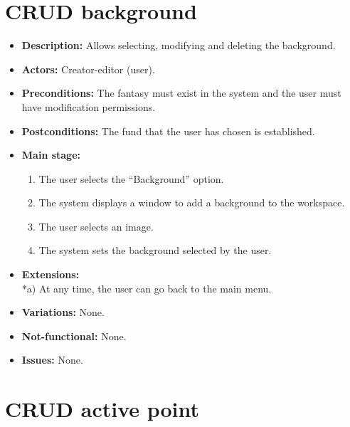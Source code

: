 \section{CRUD background}
\begin{itemize}
	\item \textbf{Description:} Allows selecting, modifying and deleting the background.
	\item \textbf{Actors:} Creator-editor (user).
	\item \textbf{Preconditions:} The fantasy must exist in the system and the user must have modification permissions.
	\item \textbf{Postconditions:} The fund that the user has chosen is established.
	\item \textbf{Main stage:}
	\begin{enumerate}
		\item The user selects the ``Background'' option.
		\item The system displays a window to add a background to the workspace.
		\item The user selects an image.
		\item The system sets the background selected by the user.
	\end{enumerate}
	\item \textbf{Extensions:} \\ *a) At any time, the user can go back to the main menu. 
	\item \textbf{Variations:} None.
	\item \textbf{Not-functional:} None.
	\item \textbf{Issues:} None.
\end{itemize}


\section{CRUD active point}
